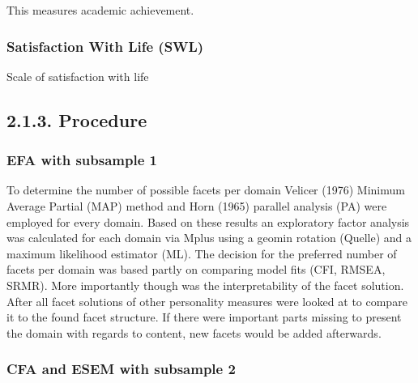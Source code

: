 \documentclass[,man,floatsintext]{apa6}
\theoremstyle{definition}
\theoremstyle{definition}
\theoremstyle{definition}
\theoremstyle{remark}
\begin{document}
This measures academic achievement.

\hypertarget{satisfaction-with-life-swl}{%
\subsubsection{Satisfaction With Life
(SWL)}\label{satisfaction-with-life-swl}}

Scale of satisfaction with life

\hypertarget{procedure}{%
\subsection{2.1.3. Procedure}\label{procedure}}

\hypertarget{efa-with-subsample-1}{%
\subsubsection{EFA with subsample 1}\label{efa-with-subsample-1}}

To determine the number of possible facets per domain Velicer (1976)
Minimum Average Partial (MAP) method and Horn (1965) parallel analysis
(PA) were employed for every domain. Based on these results an
exploratory factor analysis was calculated for each domain via Mplus
using a geomin rotation (Quelle) and a maximum likelihood estimator
(ML). The decision for the preferred number of facets per domain was
based partly on comparing model fits (CFI, RMSEA, SRMR). More
importantly though was the interpretability of the facet solution. After
all facet solutions of other personality measures were looked at to
compare it to the found facet structure. If there were important parts
missing to present the domain with regards to content, new facets would
be added afterwards.

\hypertarget{cfa-and-esem-with-subsample-2}{%
\subsubsection{CFA and ESEM with subsample
2}\label{cfa-and-esem-with-subsample-2}}
\end{document}
